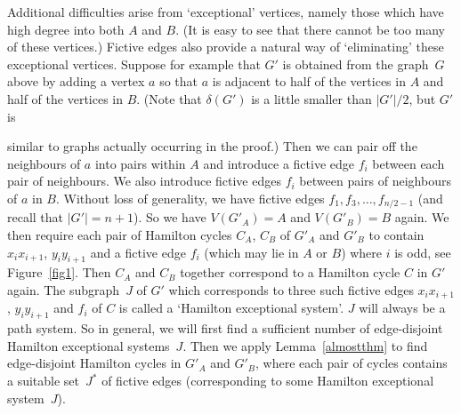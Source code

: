 \documentclass{memo-l}
\def\COMMENT#1{}
\numberwithin{section}{chapter}
\numberwithin{equation}{section}
\numberwithin{firstthm}{section}
\numberwithin{figure}{section}
\begin{document}
Additional difficulties arise from `exceptional' vertices, namely those which have high degree into both $A$ and $B$.
(It is easy to see that there cannot be too many of these vertices.)
Fictive edges also provide a natural way of `eliminating' these exceptional vertices.
Suppose for example that $G'$ is obtained from the graph~$G$ above by adding a vertex
$a$  so that $a$ is adjacent to half of the vertices in $A$ and half of the vertices in $B$. 
(Note that $\delta(G')$ is a little smaller than $|G'|/2$, but $G'$ is%
   \COMMENT{Daniela: replaced it by $G'$} 
similar to graphs actually occurring in the proof.)
Then we can pair off the neighbours of $a$ into pairs  within $A$ and introduce a fictive edge $f_i$ between each pair of neighbours.
We also introduce fictive edges $f_i$ between pairs of neighbours of $a$ in $B$. 
Without loss of generality, we have fictive edges $f_1,f_3,\dots,f_{n/2-1}$ (and recall that $|G'| = n+1$).
So we have $V(G'_A)=A$ and $V(G'_B)=B$ again.
We then require each pair of Hamilton cycles $C_A$, $C_B$ of $G'_A$ and $G'_B$ to contain 
$x_ix_{i+1}$, $y_iy_{i+1}$ and a fictive edge $f_i$ (which may lie in $A$ or $B$) where $i$ is odd, see Figure~\ref{fig1}.
Then $C_A$ and $C_B$ together correspond to a Hamilton cycle $C$ in $G'$ again.
The subgraph~$J$ of $G'$ which corresponds to three such fictive edges $x_ix_{i+1}$, $y_iy_{i+1}$ and $f_i$
of $C$ is called a `Hamilton exceptional system'.
$J$ will always be a path system.
So in general, we will first find a sufficient number of edge-disjoint Hamilton exceptional systems~$J$.
Then we apply Lemma~\ref{almostthm}  to find edge-disjoint Hamilton cycles in $G'_A$ and $G'_B$,
where each pair of cycles contains a suitable set~$J^*$ of fictive edges (corresponding to some Hamilton exceptional system~$J$).
\end{document}
